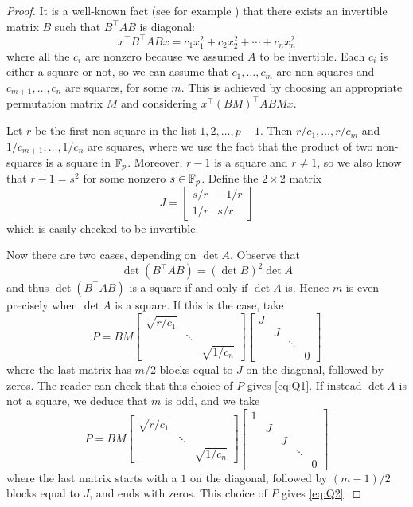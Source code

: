 \begin{proof}
	It is a well-known fact (see for example \cite[Prop.~42:1]{omeara}) that there exists an invertible matrix $B$ such that $B^\top A B$ is diagonal:
	\[
	x^\top B^\top A B x = c_1 x_1^2 + c_2 x_2^2 + \cdots + c_n x_n^2
	\]
	where all the $c_i$ are nonzero because we assumed $A$ to be invertible. Each $c_i$ is either a square or not, so we can assume that $c_1,\ldots,c_m$ are non-squares and $c_{m+1},\ldots,c_n$ are squares, for some $m$. This is achieved by choosing an appropriate permutation matrix $M$ and considering $x^\top (BM)^\top A BMx$.
	
	Let $r$ be the first non-square in the list $1,2,\ldots,p-1$. Then $r/c_1,\ldots,r/c_m$ and $1/c_{m+1},\ldots,1/c_n$ are squares, where we use the fact that the product of two non-squares is a square in $\mathbb{F}_p$. Moreover, $r-1$ is a square and $r \neq 1$, so we also know that $r-1 = s^2$ for some nonzero $s\in \mathbb{F}_p$. Define the $2\times 2$ matrix
	\[
		J = \begin{bmatrix}
			s/r & -1/r\\
			1/r & s/r
		\end{bmatrix}
	\]
	which is easily checked to be invertible.
	
	Now there are two cases, depending on $\det A$. Observe that
	\[
		\det (B^\top A B) = (\det B)^2 \det A
	\]
	and thus $\det(B^\top A B)$ is a square if and only if $\det A$ is. Hence $m$ is even precisely when $\det A$ is a square. If this is the case, take
	\[
		P = BM
		\begin{bmatrix}
		\sqrt{r/c_1} & &\\
		& \ddots &\\
		&& \sqrt{1/c_n}
		\end{bmatrix}
		\begin{bmatrix}
			J & & &\\
			& J & &\\
			&& \ddots &\\
			&&& 0
		\end{bmatrix}
	\]
	where the last matrix has $m/2$ blocks equal to $J$ on the diagonal, followed by zeros. The reader can check that this choice of $P$ gives \eqref{eq:Q1}. If instead $\det A$ is not a square, we deduce that $m$ is odd, and we take
	\[
		P = BM
		\begin{bmatrix}
		\sqrt{r/c_1} & &\\
		& \ddots &\\
		&& \sqrt{1/c_n}
		\end{bmatrix}
		\begin{bmatrix}
		1&  & & &\\
		& J &&&\\
		&& J & &\\
		&&& \ddots &\\
		&&&& 0
		\end{bmatrix}
	\]
	where the last matrix starts with a $1$ on the diagonal, followed by $(m-1)/2$ blocks equal to $J$, and ends with zeros. This choice of $P$ gives \eqref{eq:Q2}.
\end{proof}

